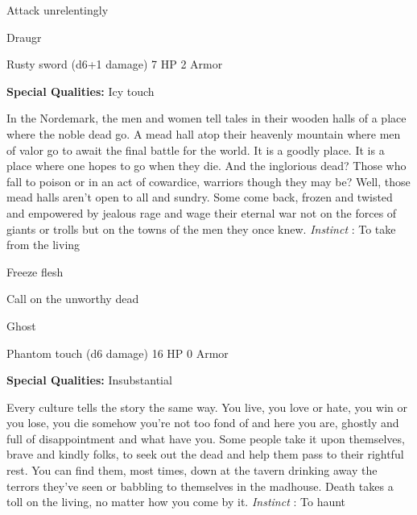 \startitemize[1,packed]
         
\item Attack unrelentingly

       
\stopitemize
       
\startMonsterName
Draugr	 
\stopMonsterName
       

Rusty sword (d6+1 damage)	7 HP	2 Armor

       


       
\startMonsterQualities
         {\bf Special Qualities:}  Icy touch
\stopMonsterQualities
       
\startMonsterDescription
In the Nordemark, the men and women tell tales in their wooden halls of a place where the noble dead go.  A mead hall atop their heavenly mountain where men of valor go to await the final battle for the world.  It is a goodly place.  It is a place where one hopes to go when they die.  And the inglorious dead?  Those who fall to poison or in an act of cowardice, warriors though they may be?  Well, those mead halls aren’t open to all and sundry. Some come back, frozen and twisted and empowered by jealous rage and wage their eternal war not on the forces of giants or trolls but on the towns of the men they once knew. {\em Instinct} : To take from the living
\stopMonsterDescription
       
\startitemize[1,packed]
         
\item Freeze flesh

         
\item Call on the unworthy dead

       
\stopitemize
       
\startMonsterName
Ghost	 
\stopMonsterName
       

Phantom touch (d6 damage)	16 HP	0 Armor

       


       
\startMonsterQualities
         {\bf Special Qualities:}  Insubstantial
\stopMonsterQualities
       
\startMonsterDescription
Every culture tells the story the same way.  You live, you love or hate, you win or you lose, you die somehow you’re not too fond of and here you are, ghostly and full of disappointment and what have you.  Some people take it upon themselves, brave and kindly folks, to seek out the dead and help them pass to their rightful rest.  You can find them, most times, down at the tavern drinking away the terrors they’ve seen or babbling to themselves in the madhouse.  Death takes a toll on the living, no matter how you come by it. {\em Instinct} : To haunt
\stopMonsterDescription
       
